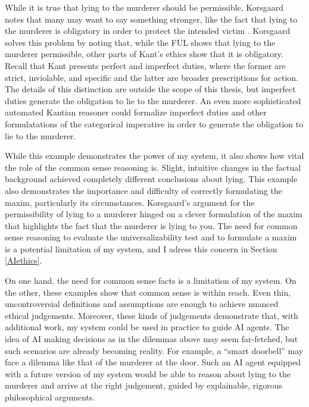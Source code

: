 \begin{isabellebody}
\begin{isamarkuptext}
{While it is true that lying to the murderer should be permissible, Korsgaard notes that many may want
to say something stronger, like the fact that lying to the murderer is obligatory in order to protect
the intended victim \citep[15]{KorsgaardRTL}. Korsgaard solves this problem by 
noting that, while the FUL shows that lying to the murderer permissible, other parts of Kant's ethics
show that it is obligatory. Recall that Kant presents perfect and imperfect duties,
where the former are strict, inviolable, and specific and the latter are broader prescriptions for action.
The details of this distinction are outside the scope of this thesis, but imperfect duties generate 
the obligation to lie to the murderer. An even more sophisticated automated Kantian reasoner could formalize 
imperfect duties and other formulatations of the categorical imperative in order to generate the 
obligation to lie to the murderer.}

While this example demonstrates the power of my system, it
also shows how vital the role of the common sense reasoning is. Slight, intuitive changes in the factual
background achieved completely different conclusions about lying. This example also demonstrates the importance
and difficulty of correctly formulating the maxim, particularly its circumstances.
Korsgaard's argument for the permissibility of lying to a 
murderer hinged on a clever formulation of the maxim that highlights the fact that the murderer is lying to you.
The need for common sense reasoning to evaluate the universalizability test and to formulate a maxim
is a potential limitation of my system, and I adress this concern in Section \ref{AIethics}.

On one hand, the need for common sense facts is a 
limitation of my system. On the other, these examples show that common sense is within reach. Even thin, 
uncontroversial definitions and assumptions are enough to achieve nuanced ethical judgements. Moreover, 
these kinds of judgements demonstrate that, with additional work, my system could be used in practice 
to guide AI agents. The idea of AI making decisions as in the dilemmas above may seem far-fetched, but
such scenarios are already becoming reality. For example, a ``smart doorbell'' may face a dilemma like that of
the murderer at the door. Such an AI agent equipped with a future version of my 
system would be able to reason about lying to the murderer and arrive at the right judgement, guided by
explainable, rigorous philosophical arguments.%
\end{isamarkuptext}\isamarkuptrue%
%
\isadelimtheory
%
\endisadelimtheory
%
\isatagtheory
%
\endisatagtheory
{\isafoldtheory}%
%
\isadelimtheory
%
\endisadelimtheory
%
\end{isabellebody}%

